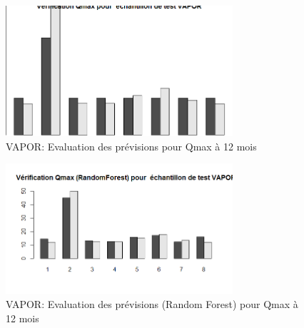 \begin{figure}[H]
\centering
\includegraphics[width=0.75\textwidth]{../Fig/VAPOR/vapor-regtree-test-qmax12.png}
\caption{VAPOR: Evaluation des prévisions pour Qmax à 12 mois}
\label{fig-vapor-regtree-test-qmax12}
\end{figure}

\begin{figure}[H]
\centering
\includegraphics[width=0.75\textwidth]{../Fig/VAPOR/vapor-forest-test-qmax12.png}
\caption{VAPOR: Evaluation des prévisions (Random Forest) pour Qmax à 12 mois}
\label{fig-vapor-regtree-test-qmax12}
\end{figure}

